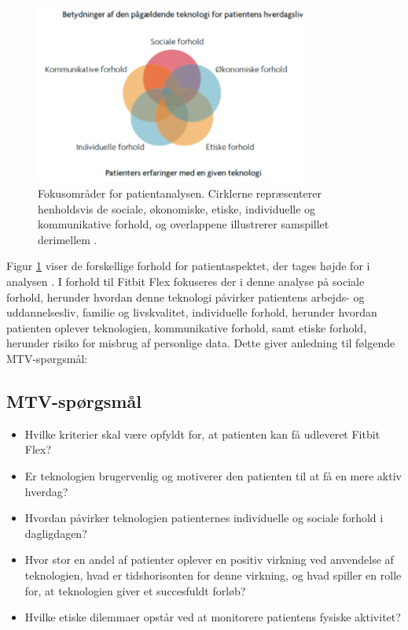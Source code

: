 \begin{figure}[H]
\centering
\includegraphics[width=0.8\textwidth]{figures/patientaspekter}
\caption{Fokusområder for patientanalysen. Cirklerne repræsenterer henholdsvis de sociale, økonomiske, etiske, individuelle og kommunikative forhold, og overlappene illustrerer samspillet derimellem \citep{mtvhaandbog}.}
\label{fig:patientaspekter}
\end{figure}

\noindent
Figur \ref{fig:patientaspekter} viser de forskellige forhold for patientaspektet, der tages højde for i analysen \citep{mtvhaandbog}. I forhold til Fitbit Flex fokuseres der i denne analyse på sociale forhold, herunder hvordan denne teknologi påvirker patientens arbejds- og uddannelsesliv, familie og livskvalitet, individuelle forhold, herunder hvordan patienten oplever teknologien, kommunikative forhold, samt etiske forhold, herunder risiko for misbrug af personlige data. Dette giver anledning til følgende MTV-spørgsmål: 

\subsection{MTV-spørgsmål}
\begin{itemize}
\item Hvilke kriterier skal være opfyldt for, at patienten kan få udleveret Fitbit Flex?
\item Er teknologien brugervenlig og motiverer den patienten til at få en mere aktiv hverdag?
\item Hvordan påvirker teknologien patienternes individuelle og sociale forhold i dagligdagen?
\item Hvor stor en andel af patienter oplever en positiv virkning ved anvendelse af teknologien, hvad er tidshorisonten for denne virkning, og hvad spiller en rolle for, at teknologien giver et succesfuldt forløb?
\item Hvilke etiske dilemmaer opstår ved at monitorere patientens fysiske aktivitet?
\end{itemize} 

